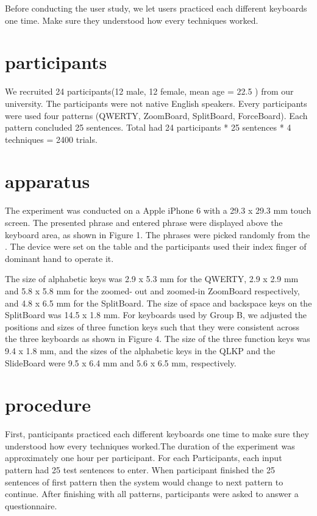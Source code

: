 \documentclass{sigchi}
\begin{document}
Before conducting the user study, we let users practiced each different keyboards one time. Make sure they understood how every techniques worked. 

\section{participants}
We recruited 24 participants(12 male, 12 female, mean age = 22.5 ) from our university. The participants were not native English speakers. Every participants were used four patterns (QWERTY, ZoomBoard, SplitBoard, ForceBoard). Each pattern concluded 25 sentences. Total had 24 participants * 25 sentences * 4 techniques = 2400 trials. 

\section{apparatus}
The experiment was conducted on a Apple iPhone 6 with a 29.3 x 29.3 mm touch screen. The presented phrase and entered phrase were displayed above the keyboard area, as shown in Figure 1. The phrases were picked randomly
from the \cite{MacKenzie:1999:DEH:302979.302983}. The device were set on the table and the participants used their index finger of dominant hand to operate it.

The size of alphabetic keys was 2.9 x 5.3 mm for the QWERTY, 2.9 x 2.9 mm and 5.8 x 5.8 mm for the zoomed- out and zoomed-in ZoomBoard respectively, and 4.8 x 6.5 mm for the SplitBoard. The size of space and backspace keys on the SplitBoard was 14.5 x 1.8 mm. For keyboards used by Group B, we adjusted the positions and sizes of three function keys such that they were consistent across the three keyboards as shown in Figure 4. The size of the three function keys was 9.4 x 1.8 mm, and the sizes of the alphabetic keys in the QLKP and the SlideBoard were 9.5 x 6.4 mm and 5.6 x 6.5 mm, respectively.

\section{procedure}
First, panticipants practiced each different keyboards one time to make sure they understood how every techniques worked.The duration of the experiment was approximately one hour per participant. For each Participants, each input pattern had 25 test sentences to enter. When participant finished the 25 sentences of first pattern then the system would change to next pattern to continue. After finishing with all patterns, participants were asked to answer a questionnaire.
\end{document}
